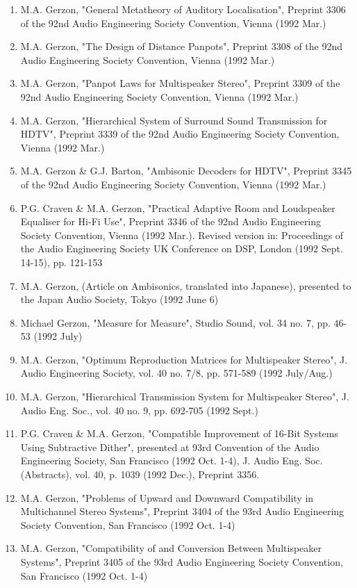 \documentclass[9pt]{amsart}
\begin{document}
\begin{enumerate}
\item M.A. Gerzon, "General Metatheory of Auditory Localisation", Preprint 3306 of the 92nd Audio Engineering Society Convention, Vienna (1992 Mar.)
\item M.A. Gerzon, "The Design of Distance Panpots", Preprint 3308 of the 92nd Audio Engineering Society Convention, Vienna (1992 Mar.)
\item M.A. Gerzon, "Panpot Laws for Multispeaker Stereo", Preprint 3309 of the 92nd Audio Engineering Society Convention, Vienna (1992 Mar.)
\item M.A. Gerzon, "Hierarchical System of Surround Sound Transmission for HDTV", Preprint 3339 of the 92nd Audio Engineering Society Convention, Vienna (1992 Mar.)
\item M.A. Gerzon \& G.J. Barton, "Ambisonic Decoders for HDTV", Preprint 3345 of the 92nd Audio Engineering Society Convention, Vienna (1992 Mar.)
\item P.G. Craven \& M.A. Gerzon, "Practical Adaptive Room and Loudspeaker Equaliser for Hi-Fi Use", Preprint 3346 of the 92nd Audio Engineering Society Convention, Vienna (1992 Mar.). Revised version in: Proceedings of the Audio Engineering Society UK Conference on DSP, London (1992 Sept. 14-15), pp. 121-153
\item M.A. Gerzon, (Article on Ambisonics, translated into Japanese), presented to the Japan Audio Society, Tokyo (1992 June 6)
\item Michael Gerzon, "Measure for Measure", Studio Sound, vol. 34 no. 7, pp. 46-53 (1992 July)
\item M.A. Gerzon, "Optimum Reproduction Matrices for Multispeaker Stereo", J. Audio Engineering Society, vol. 40 no. 7/8, pp. 571-589 (1992 July/Aug.)
\item M.A. Gerzon, "Hierarchical Transmission System for Multispeaker Stereo", J. Audio Eng. Soc., vol. 40 no. 9, pp. 692-705 (1992 Sept.)
\item P.G. Craven \& M.A. Gerzon, "Compatible Improvement of 16-Bit Systems Using Subtractive Dither", presented at 93rd Convention of the Audio Engineering Society, San Francisco (1992 Oct. 1-4), J. Audio Eng. Soc. (Abstracts), vol. 40, p. 1039 (1992 Dec.), Preprint 3356.
\item M.A. Gerzon, "Problems of Upward and Downward Compatibility in Multichannel Stereo Systems", Preprint 3404 of the 93rd Audio Engineering Society Convention, San Francisco (1992 Oct. 1-4)
\item M.A. Gerzon, "Compatibility of and Conversion Between Multispeaker Systems", Preprint 3405 of the 93rd Audio Engineering Society Convention, San Francisco (1992 Oct. 1-4)

\end{enumerate}
\end{document}
